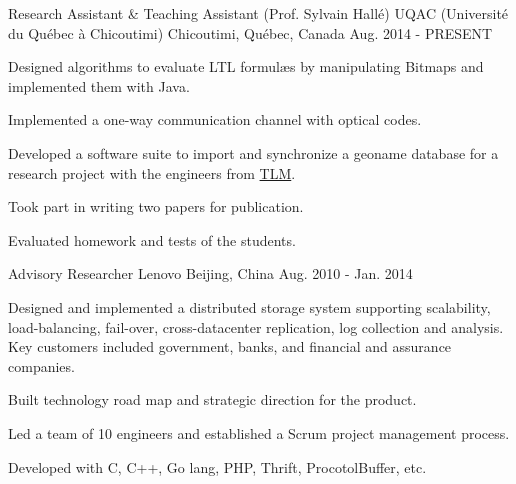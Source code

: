 


\begin{cventries}

  \cventry
    {Research Assistant \& Teaching Assistant (Prof. Sylvain Hallé)} %
    {UQAC (Université du Québec à Chicoutimi)} %
    {Chicoutimi, Québec, Canada} %
    {Aug. 2014 - PRESENT} %
    {
      \begin{cvitems} %
        \item {Designed algorithms to evaluate LTL formul\ae{}s by manipulating Bitmaps and implemented them with Java.}
        \item {Implemented a one-way communication channel with optical codes.}
        \item {Developed a software suite to import and synchronize a geoname database for a research project with the engineers from \href{http://solutionstlm.com/}{TLM}.}
        \item {Took part in writing two papers for publication.}
        \item {Evaluated homework and tests of the students.}
      \end{cvitems}
    }

  \cventry
    {Advisory Researcher} %
    {Lenovo} %
    {Beijing, China} %
    {Aug. 2010 - Jan. 2014} %
    {
      \begin{cvitems} %
        \item {Designed and implemented a distributed storage system supporting scalability, load-balancing, fail-over, cross-datacenter replication, log collection and analysis. Key customers included government, banks, and financial and assurance companies.}
        \item {Built technology road map and strategic direction for the product.}
        \item {Led a team of 10 engineers and established a Scrum project management process.}
        \item {Developed with C, C++, Go lang, PHP, Thrift, ProcotolBuffer, etc.}
      \end{cvitems}
    }


\end{cventries}
